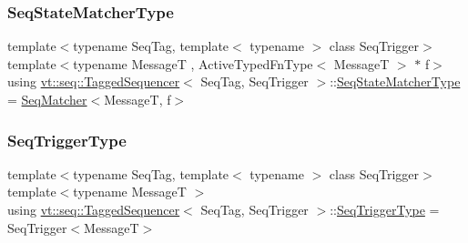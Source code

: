 \mbox{\label{structvt_1_1seq_1_1_tagged_sequencer_a8b215c5e7be7295118d6d0716f3a8052}} 
\subsubsection{\texorpdfstring{Seq\+State\+Matcher\+Type}{SeqStateMatcherType}}
{\footnotesize\ttfamily template$<$typename Seq\+Tag, template$<$ typename $>$ class Seq\+Trigger$>$ \\
template$<$typename MessageT , Active\+Typed\+Fn\+Type$<$ Message\+T $>$ $\ast$ f$>$ \\
using \hyperlink{structvt_1_1seq_1_1_tagged_sequencer}{vt\+::seq\+::\+Tagged\+Sequencer}$<$ Seq\+Tag, Seq\+Trigger $>$\+::\hyperlink{structvt_1_1seq_1_1_tagged_sequencer_a8b215c5e7be7295118d6d0716f3a8052}{Seq\+State\+Matcher\+Type} =  \hyperlink{structvt_1_1seq_1_1_seq_matcher}{Seq\+Matcher}$<$MessageT, f$>$}

\mbox{\label{structvt_1_1seq_1_1_tagged_sequencer_a4b015f2f7d3197a66af5576f0e63a834}} 
\subsubsection{\texorpdfstring{Seq\+Trigger\+Type}{SeqTriggerType}}
{\footnotesize\ttfamily template$<$typename Seq\+Tag, template$<$ typename $>$ class Seq\+Trigger$>$ \\
template$<$typename MessageT $>$ \\
using \hyperlink{structvt_1_1seq_1_1_tagged_sequencer}{vt\+::seq\+::\+Tagged\+Sequencer}$<$ Seq\+Tag, Seq\+Trigger $>$\+::\hyperlink{structvt_1_1seq_1_1_tagged_sequencer_a4b015f2f7d3197a66af5576f0e63a834}{Seq\+Trigger\+Type} =  Seq\+Trigger$<$MessageT$>$}

\mbox{\label{structvt_1_1seq_1_1_tagged_sequencer_a1c8ee839258d0f88c49ef660267a81d5}} 
